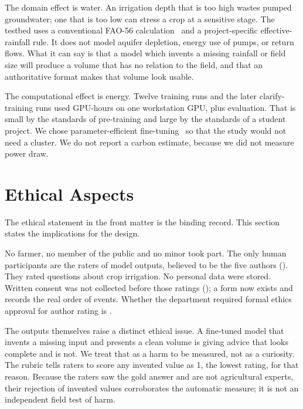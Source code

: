The domain effect is water. An irrigation depth that is too high wastes pumped groundwater; one that is too low can stress a crop at a sensitive stage. The testbed uses a conventional FAO-56 calculation~\cite{allen1998fao56} and a project-specific effective-rainfall rule. It does not model aquifer depletion, energy use of pumps, or return flows. What it can say is that a model which invents a missing rainfall or field size will produce a volume that has no relation to the field, and that an authoritative format makes that volume look usable.

The computational effect is energy. Twelve training runs and the later clarify-training runs used \TrainGpuHoursTwelve GPU-hours on one workstation GPU, plus evaluation. That is small by the standards of pre-training and large by the standards of a student project. We chose parameter-efficient fine-tuning~\cite{hu2022lora,dettmers2023qlora} so that the study would not need a cluster. We do not report a carbon estimate, because we did not measure power draw.

\section{Ethical Aspects}
\label{sec:impact-ethics}

The ethical statement in the front matter is the binding record. This section states the implications for the design.

No farmer, no member of the public and no minor took part. The only human participants are the raters of model outputs, believed to be the five authors (). They rated questions about crop irrigation. No personal data were stored. Written consent was not collected before those ratings (\PENDINGCONSENT{}); a form now exists and records the real order of events. Whether the department required formal ethics approval for author rating is .

The outputs themselves raise a distinct ethical issue. A fine-tuned model that invents a missing input and presents a clean volume is giving advice that looks complete and is not. We treat that as a harm to be measured, not as a curiosity. The rubric tells raters to score any invented value as 1, the lowest rating, for that reason. Because the raters saw the gold answer and are not agricultural experts, their rejection of invented values corroborates the automatic measure; it is not an independent field test of harm.

